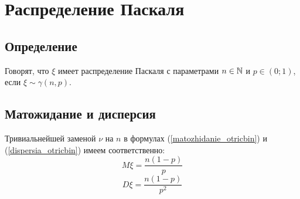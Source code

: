 \section{Распределение Паскаля}

\subsection{Определение}
Говорят, что $\xi$ имеет распределение Паскаля с параметрами $n\in\mathbb{N}$ и $p\in(0;1)$, если $\xi\sim\gamma(n,p)$.

\subsection{Матожидание и дисперсия}
Тривиальнейшей заменой $\nu$ на $n$ в формулах (\ref{matozhidanie_otricbin}) и (\ref{dispersia_otricbin}) имеем соответственно:
\begin{equation}
M\xi=\frac{n(1-p)}{p}
\end{equation}
\begin{equation}
D\xi=\frac{n(1-p)}{p^2}
\end{equation}

